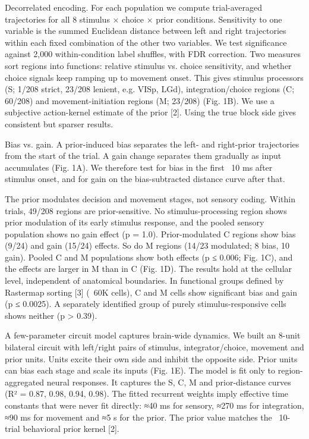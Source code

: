 \documentclass[12pt]{article}
\begin{document}
Decorrelated encoding. For each population we compute trial-averaged trajectories for all 8 stimulus × choice × prior conditions. Sensitivity to one variable is the summed Euclidean distance between left and right trajectories within each fixed combination of the other two variables. We test significance against 2,000 within-condition label shuffles, with FDR correction. Two measures sort regions into functions: relative stimulus vs. choice sensitivity, and whether choice signals keep ramping up to movement onset. This gives stimulus processors (S; 1/208 strict, 23/208 lenient, e.g. VISp, LGd), integration/choice regions (C; 60/208) and movement-initiation regions (M; 23/208) (Fig. 1B). We use a subjective action-kernel estimate of the prior [2]. Using the true block side gives consistent but sparser results.

Bias vs. gain. A prior-induced bias separates the left- and right-prior trajectories from the start of the trial. A gain change separates them gradually as input accumulates (Fig. 1A). We therefore test for bias in the first ~10 ms after stimulus onset, and for gain on the bias-subtracted distance curve after that.

The prior modulates decision and movement stages, not sensory coding. Within trials, 49/208 regions are prior-sensitive. No stimulus-processing region shows prior modulation of its early stimulus response, and the pooled sensory population shows no gain effect (p = 1.0). Prior-modulated C regions show bias (9/24) and gain (15/24) effects. So do M regions (14/23 modulated; 8 bias, 10 gain). Pooled C and M populations show both effects (p ≤ 0.006; Fig. 1C), and the effects are larger in M than in C (Fig. 1D). The results hold at the cellular level, independent of anatomical boundaries. In functional groups defined by Rastermap sorting [3] (~60K cells), C and M cells show significant bias and gain (p ≤ 0.0025). A separately identified group of purely stimulus-responsive cells shows neither (p > 0.39).

A few-parameter circuit model captures brain-wide dynamics. We built an 8-unit bilateral circuit with left/right pairs of stimulus, integrator/choice, movement and prior units. Units excite their own side and inhibit the opposite side. Prior units can bias each stage and scale its inputs (Fig. 1E). The model is fit only to region-aggregated neural responses. It captures the S, C, M and prior-distance curves (R² = 0.87, 0.98, 0.94, 0.98). The fitted recurrent weights imply effective time constants that were never fit directly: ≈40 ms for sensory, ≈270 ms for integration, ≈90 ms for movement and ≈5 s for the prior. The prior value matches the ~10-trial behavioral prior kernel [2].
\end{document}
